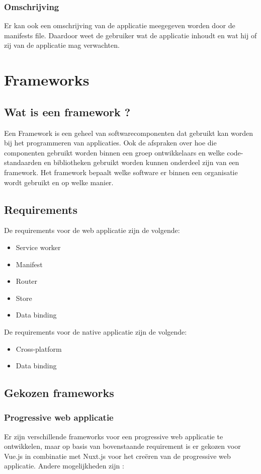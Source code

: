 \subsubsection{Omschrijving}
Er kan ook een omschrijving van de applicatie meegegeven worden door de manifests file. Daardoor weet de gebruiker wat de applicatie inhoudt en wat hij of zij van de applicatie mag verwachten.

\section{Frameworks}
\subsection{Wat is een framework ?}
Een Framework is een geheel van softwarecomponenten dat gebruikt kan worden bij het programmeren van applicaties. Ook de afspraken over hoe die componenten gebruikt worden binnen een groep ontwikkelaars en welke code-standaarden en bibliotheken gebruikt worden kunnen onderdeel zijn van een framework. Het framework bepaalt welke software er binnen een organisatie wordt gebruikt en op welke manier. \cite{WIKI_FRAMEWORK}

\subsection{Requirements}
De requirements voor de web applicatie zijn de volgende:
\begin{itemize}
	\item Service worker
	\item Manifest
	\item Router
	\item Store
	\item Data binding
\end{itemize}

De requirements voor de native applicatie zijn de volgende: 
\begin{itemize}
	\item Cross-platform
	\item Data binding
\end{itemize}

\subsection{Gekozen frameworks}
\subsubsection{Progressive web applicatie}
Er zijn verschillende frameworks voor een progressive web applicatie te ontwikkelen, maar op basis van bovenstaande requirement is er gekozen voor Vue.js in combinatie met Nuxt.js voor het creëren van de progressive web applicatie.
Andere mogelijkheden zijn \cite{FRAMEWORKS_PROGRESSIVEWEBAPPS} :

